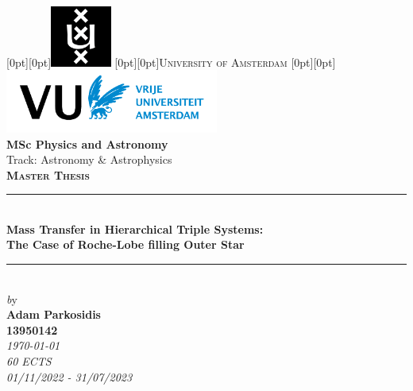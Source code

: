 \begin{titlepage}

\newcommand{\HRule}{\rule{\linewidth}{0.8mm}}
\center
 \vspace*{0.5cm}  %
\raisebox{0.05cm}[0pt][0pt]{\includegraphics[width=2.0cm]{Thesis/logos/UvA_logo.png}}
\raisebox{0.7cm}[0pt][0pt]{\textsc{\Huge University of Amsterdam}}
\raisebox{-1.85cm}[0pt][0pt]{\includegraphics[width=7.0cm]{Thesis/logos/VUlogo.png}}\\[2.0 cm]

\Large{\textbf{MSc Physics and Astronomy}}\\%
\Large{Track: Astronomy \& Astrophysics}\\[0.7cm] %
\textsc{\Large \textbf{Master Thesis}}\\[0.2cm]


\HRule \\[0.3cm]

{ \huge \bfseries Mass Transfer in Hierarchical Triple Systems:
}\\[0.8cm] %
{\Large \bfseries The Case of Roche-Lobe filling Outer Star} %

\HRule \\[0.7cm]
 

{\Large \emph by}\\[0.6cm]
{\Large \bfseries Adam Parkosidis\\ %
13950142}\\[0.4cm] %
{\large  \emph{\today}}\\ %
{\large  \emph{60 ECTS}}\\ %
{\large  \emph{01/11/2022 - 31/07/2023}}\\[1.8cm] %


\end{titlepage}
